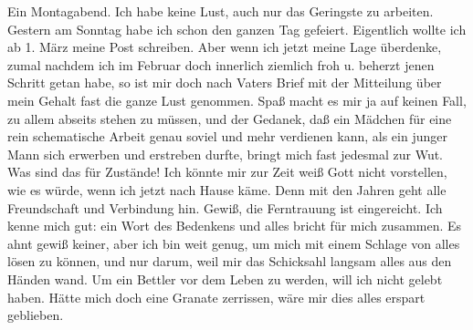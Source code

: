 \def\day{6. III. 1944.}
\mktitle

Ein Montagabend.
Ich habe keine Lust, auch nur das Geringste zu arbeiten.
Gestern am Sonntag habe ich schon den ganzen Tag gefeiert.
Eigentlich wollte ich ab  1. M\"{a}rz meine Post schreiben.
Aber wenn ich jetzt meine Lage \"{u}berdenke, zumal nachdem ich im Februar doch innerlich ziemlich froh u. beherzt jenen Schritt getan habe, so ist mir doch nach Vaters Brief mit der Mitteilung \"{u}ber mein Gehalt fast die ganze Lust genommen.
Spa{\ss} macht es mir ja auf keinen Fall, zu allem abseits stehen zu m\"{u}ssen, und der Gedanek, da{\ss} ein M\"{a}dchen f\"{u}r eine rein schematische Arbeit genau soviel und mehr verdienen kann, als ein junger Mann sich erwerben und erstreben durfte, bringt mich fast jedesmal zur Wut.
Was sind das f\"{u}r Zust\"{a}nde!
Ich k\"{o}nnte mir zur Zeit wei{\ss} Gott nicht vorstellen, wie es w\"{u}rde, wenn ich jetzt nach Hause k\"{a}me.
Denn mit den Jahren geht alle Freundschaft und Verbindung hin.
Gewi{\ss}, die Ferntrauung ist eingereicht.
Ich kenne mich gut: ein Wort des Bedenkens und alles bricht f\"{u}r mich zusammen.
Es ahnt gewi{\ss} keiner, aber ich bin weit genug, um mich mit einem Schlage von alles l\"{o}sen zu k\"{o}nnen, und nur darum, weil mir das Schicksahl langsam alles aus den H\"{a}nden wand.
Um ein Bettler vor dem Leben zu werden, will ich nicht gelebt haben.
H\"{a}tte mich doch eine Granate zerrissen, w\"{a}re mir dies alles erspart geblieben.

\clearpage
